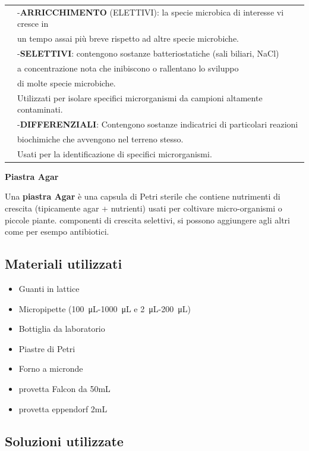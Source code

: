 \begin{tabular}{ll}
& -\textbf{ARRICCHIMENTO} (ELETTIVI): la specie microbica di interesse vi cresce in \\ \cline{1-1}
& un tempo assai più breve rispetto ad altre specie microbiche.\\
& -\textbf{SELETTIVI}: contengono sostanze batteriostatiche (sali biliari, NaCl) \\
&  a concentrazione nota che inibiscono o rallentano lo sviluppo \\
& di molte specie microbiche. \\
&  Utilizzati per isolare specifici microrganismi da campioni altamente contaminati.\\
& -\textbf{DIFFERENZIALI}: Contengono sostanze indicatrici di particolari reazioni \\
& biochimiche che avvengono nel terreno stesso. \\
& Usati per la identificazione di specifici microrganismi.\\


\end{tabular}

\textbf{Piastra Agar}
\vspace{0.3cm}

Una \textbf{piastra Agar} è una capsula di Petri sterile che contiene nutrimenti
di crescita (tipicamente agar + nutrienti) usati per coltivare micro-organismi o piccole piante.
componenti di crescita selettivi, si possono aggiungere agli altri come per esempo antibiotici.




\subsection{Materiali utilizzati}

\begin{itemize}
	\item Guanti in lattice
	\item Micropipette (\SI{100}{\micro\liter}-\SI{1000}{\micro\liter} e \SI{2}{\micro\liter}-\SI{200}{\micro\liter})
	\item Bottiglia da laboratorio
  \item Piastre di Petri
	\item Forno a micronde
  \item provetta Falcon da 50mL
  \item provetta eppendorf 2mL

\end{itemize}

\subsection{Soluzioni utilizzate}

